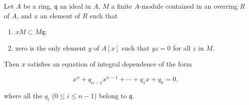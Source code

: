 Let $A$ be a ring, $\mathfrak{q}$ an ideal in $A$, $M$ a finite $A$-module contained in an overring $R$ of $A$, and $x$ an element of $R$ such that

\begin{enumerate}
  \item[(1')] $xM \subset M\mathfrak{q}$;
  \item[(2')] zero is the only element $y$ of $A[x]$ such that $yz = 0$ for all $z$ in $M$.
\end{enumerate}

Then $x$ satisfies an equation of integral dependence of the form

$$x^n + q_{n-1}x^{n-1} + \cdots + q_1 x + q_0 = 0,$$

where all the $q_i$ ($0 \leq i \leq n-1$) belong to $\mathfrak{q}$.
